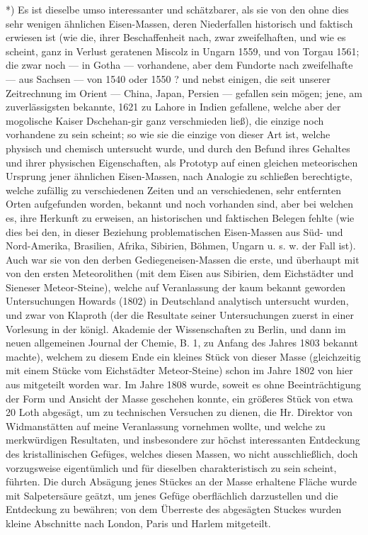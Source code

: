 \documentclass[a4paper, 11pt, oneside, german]{article}
\begin{document}
*) Es ist dieselbe umso interessanter und schätzbarer, als sie von den ohne dies sehr wenigen ähnlichen Eisen-Massen, deren Niederfallen historisch und faktisch erwiesen ist (wie die, ihrer Beschaffenheit nach, zwar zweifelhaften, und wie es scheint, ganz in Verlust geratenen Miscolz in Ungarn 1559, und von Torgau 1561; die zwar noch --- in Gotha --- vorhandene, aber dem Fundorte nach zweifelhafte --- aus Sachsen --- von 1540 oder 1550 ? und nebst einigen, die seit unserer Zeitrechnung im Orient --- China, Japan, Persien --- gefallen sein mögen; jene, am zuverlässigsten bekannte, 1621 zu Lahore in Indien gefallene, welche aber der mogolische Kaiser Dschehan-gir ganz verschmieden ließ), die einzige noch vorhandene zu sein scheint; so wie sie die einzige von dieser Art ist, welche physisch und chemisch untersucht wurde, und durch den Befund ihres Gehaltes und ihrer physischen Eigenschaften, als Prototyp auf einen gleichen meteorischen Ursprung jener ähnlichen Eisen-Massen, nach Analogie zu schließen berechtigte, welche zufällig zu verschiedenen Zeiten und an verschiedenen, sehr entfernten Orten aufgefunden worden, bekannt und noch vorhanden sind, aber bei welchen es, ihre Herkunft zu erweisen, an historischen und faktischen Belegen fehlte (wie dies bei den, in dieser Beziehung problematischen Eisen-Massen aus Süd- und Nord-Amerika, Brasilien, Afrika, Sibirien, Böhmen, Ungarn u. s. w. der Fall ist). Auch war sie von den derben Gediegeneisen-Massen die erste, und überhaupt mit von den ersten Meteorolithen (mit dem Eisen aus Sibirien, dem Eichstädter und Sieneser Meteor-Steine), welche auf Veranlassung der kaum bekannt geworden Untersuchungen Howards (1802) in Deutschland analytisch untersucht wurden, und zwar von Klaproth (der die Resultate seiner Untersuchungen zuerst in einer Vorlesung in der königl. Akademie der Wissenschaften zu Berlin, und dann im neuen allgemeinen Journal der Chemie, B. 1, zu Anfang des Jahres 1803 bekannt machte), welchem zu diesem Ende ein kleines Stück von dieser Masse (gleichzeitig mit einem Stücke vom Eichstädter Meteor-Steine) schon im Jahre 1802 von hier aus mitgeteilt worden war. Im Jahre 1808 wurde, soweit es ohne Beeinträchtigung der Form und Ansicht der Masse geschehen konnte, ein größeres Stück von etwa 20 Loth abgesägt, um zu technischen Versuchen zu dienen, die Hr. Direktor von Widmanstätten auf meine Veranlassung vornehmen wollte, und welche zu merkwürdigen Resultaten, und insbesondere zur höchst interessanten Entdeckung des kristallinischen Gefüges, welches diesen Massen, wo nicht ausschließlich, doch vorzugsweise eigentümlich und für dieselben charakteristisch zu sein scheint, führten. Die durch Absägung jenes Stückes an der Masse erhaltene Fläche wurde mit Salpetersäure geätzt, um jenes Gefüge oberflächlich darzustellen und die Entdeckung zu bewähren; von dem Überreste des abgesägten Stuckes wurden kleine Abschnitte nach London, Paris und Harlem mitgeteilt.
\end{document}
